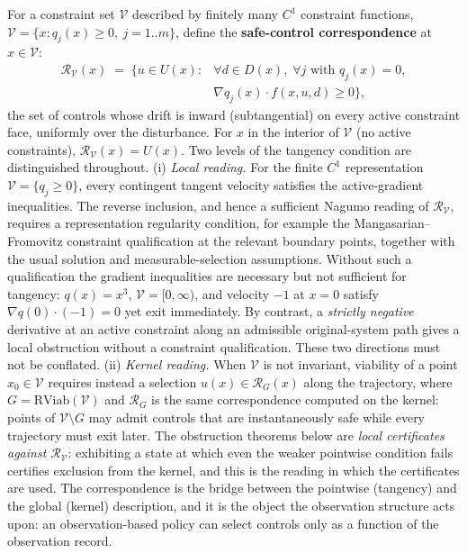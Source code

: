 \documentclass[10pt,twocolumn]{article}
\theoremstyle{definition}
\begin{document}
For a constraint set \(\mathcal{V}\) described by finitely many \(C^1\)
constraint functions,
\(\mathcal{V} = \{ x : q_j(x) \ge 0,\ j = 1..m \}\), define the
\textbf{safe-control correspondence} at \(x \in \mathcal{V}\):
\[
\begin{aligned}
\mathcal{R}_{\mathcal{V}}(x) \;=\; \bigl\{ u \in U(x) : {}& \forall d \in D(x),\; \forall j \text{ with } q_j(x) = 0,\\
& \nabla q_j(x) \cdot f(x, u, d) \ge 0 \bigr\},
\end{aligned}
\]
the set of controls whose drift is inward (subtangential) on every
active constraint face, uniformly over the disturbance. For \(x\) in the
interior of \(\mathcal{V}\) (no active constraints),
\(\mathcal{R}_{\mathcal{V}}(x) = U(x)\). Two levels of the tangency condition are distinguished throughout. (i) \emph{Local reading.} For the finite \(C^1\) representation \(\mathcal V=\{q_j\ge0\}\), every contingent tangent velocity satisfies the active-gradient inequalities. The reverse inclusion, and hence a sufficient Nagumo reading of \(\mathcal R_{\mathcal V}\), requires a representation regularity condition, for example the Mangasarian--Fromovitz constraint qualification at the relevant boundary points, together with the usual solution and measurable-selection assumptions. Without such a qualification the gradient inequalities are necessary but not sufficient for tangency: \(q(x)=x^3\), \(\mathcal V=[0,\infty)\), and velocity \(-1\) at \(x=0\) satisfy \(\nabla q(0)\cdot(-1)=0\) yet exit immediately. By contrast, a \emph{strictly negative} derivative at an active constraint along an admissible original-system path gives a local obstruction without a constraint qualification. These two directions must not be conflated.
(ii) \emph{Kernel reading.} When \(\mathcal{V}\) is not invariant, viability of a point \(x_0 \in \mathcal{V}\) requires instead a selection \(u(x) \in \mathcal{R}_G(x)\) along the trajectory, where \(G = \mathrm{RViab}(\mathcal{V})\) and \(\mathcal{R}_G\) is the same correspondence computed on the kernel: points of
\(\mathcal{V} \setminus G\) may admit controls that are instantaneously
safe while every trajectory must exit later. The obstruction
theorems below are \emph{local certificates against
\(\mathcal{R}_{\mathcal{V}}\)}: exhibiting a state at which even the
weaker pointwise condition fails certifies exclusion from the kernel,
and this is the reading in which the certificates are used. The
correspondence is the bridge between the pointwise (tangency) and the
global (kernel) description, and it is the object the observation
structure acts upon: an observation-based policy can select controls
only as a function of the observation record.
\end{document}
